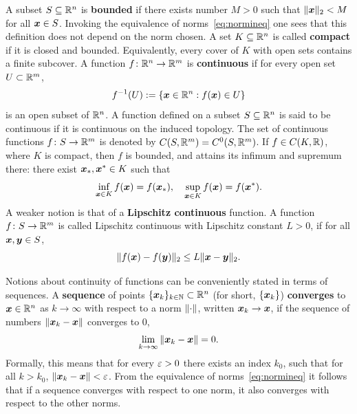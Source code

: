 A subset $S\subseteq \mathbb{R}^n$ is \textbf{bounded} if there exists number $M>0$ such that $\Vert {\bm{x}}\Vert_2<M$ for all $\bm{x}\in S$. Invoking the equivalence of norms~\eqref{eq:normineq} one sees that this definition does not depend on the norm chosen.
A set $K\subseteq \mathbb{R}^n$ is called \textbf{compact} if it is closed and bounded. Equivalently, every cover of $K$ with open sets contains a finite subcover.  
A function $f\colon \mathbb{R}^n\to \mathbb{R}^m$ is \textbf{continuous} if for every open set $U\subset \mathbb{R}^m$,
\begin{equation*}
 f^{-1}(U) := \{\bm{x}\in \mathbb{R}^n\mathrel{\mathop{:}} f(\bm{x})\in U\}
\end{equation*}
is an open subset of $\mathbb{R}^n$. 
A function defined on a subset $S\subseteq \mathbb{R}^n$ is said to be continuous if it is continuous on the induced topology. The set of continuous functions $f\colon S\to \mathbb{R}^m$ is denoted by $C(S,\mathbb{R}^m)=C^0(S,\mathbb{R}^m)$.
If $f\in C(K,\mathbb{R})$, where $K$ is compact, then $f$ is bounded, and attains its infimum and supremum there: there exist $\bm{x}_*,\bm{x}^*\in K$ such that
\begin{equation*}
 \inf_{\bm{x}\in K} f(\bm{x}) = f(\bm{x}_*), \quad \sup_{\bm{x}\in K} f(\bm{x}) = f(\bm{x}^*).
\end{equation*}
A weaker notion is that of a \textbf{Lipschitz continuous} function. A function $f\colon S\to \mathbb{R}^m$ is called Lipschitz continuous with Lipschitz constant $L>0$, if for all $\bm{x},\bm{y}\in S$,
\begin{equation*}
 \Vert {f(\bm{x})-f(\bm{y})}\Vert_2 \leq L\Vert {\bm{x}-\bm{y}}\Vert_2.
\end{equation*}

\strictpagecheck
Notions about continuity of functions can be conveniently stated in terms of sequences.
A \textbf{sequence} of points $\{\bm{x}_k\}_{k\in \mathbb{N}}\subset \mathbb{R}^n$ (for short, $\{\bm{x}_k\}$) 
\textbf{converges} to $\bm{x}\in \mathbb{R}^n$ as $k\to \infty$ with respect to a norm $\Vert {\cdot}\Vert$, written $\bm{x}_k\to \bm{x}$, if the sequence of numbers $\Vert {\bm{x}_k-\bm{x}}\Vert$ converges to $0$,
\begin{equation*}
 \lim_{k\to \infty} \Vert {\bm{x}_k-\bm{x}}\Vert=0.
\end{equation*}
Formally, this means that for every $\varepsilon>0$ there exists an index $k_0$, such that for all $k>k_0$, $\Vert {\bm{x}_k-\bm{x}}\Vert<\varepsilon$. From the equivalence of norms~\eqref{eq:normineq} it follows that if a sequence converges with respect to one norm, it also converges with respect to the other norms. 

